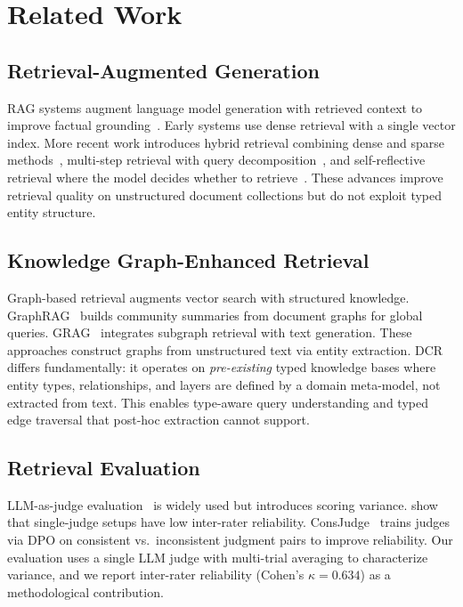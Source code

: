 \documentclass[11pt,a4paper]{article}
\begin{document}
\section{Related Work}
\label{sec:related}

\subsection{Retrieval-Augmented Generation}

RAG systems augment language model generation with retrieved context to improve factual grounding~\citep{lewis2020rag}. Early systems use dense retrieval with a single vector index. More recent work introduces hybrid retrieval combining dense and sparse methods~\citep{chen2024bge}, multi-step retrieval with query decomposition~\citep{press2023selfask}, and self-reflective retrieval where the model decides whether to retrieve~\citep{asai2024selfrag}. These advances improve retrieval quality on unstructured document collections but do not exploit typed entity structure.

\subsection{Knowledge Graph-Enhanced Retrieval}

Graph-based retrieval augments vector search with structured knowledge. GraphRAG~\citep{edge2024graphrag} builds community summaries from document graphs for global queries. GRAG~\citep{hu2024grag} integrates subgraph retrieval with text generation. These approaches construct graphs from unstructured text via entity extraction. DCR differs fundamentally: it operates on \emph{pre-existing} typed knowledge bases where entity types, relationships, and layers are defined by a domain meta-model, not extracted from text. This enables type-aware query understanding and typed edge traversal that post-hoc extraction cannot support.

\subsection{Retrieval Evaluation}

LLM-as-judge evaluation~\citep{zheng2023judging} is widely used but introduces scoring variance. \citet{shankar2024validates} show that single-judge setups have low inter-rater reliability. ConsJudge~\citep{liu2025consjudge} trains judges via DPO on consistent vs.\ inconsistent judgment pairs to improve reliability. Our evaluation uses a single LLM judge with multi-trial averaging to characterize variance, and we report inter-rater reliability (Cohen's $\kappa = 0.634$) as a methodological contribution.
\end{document}
